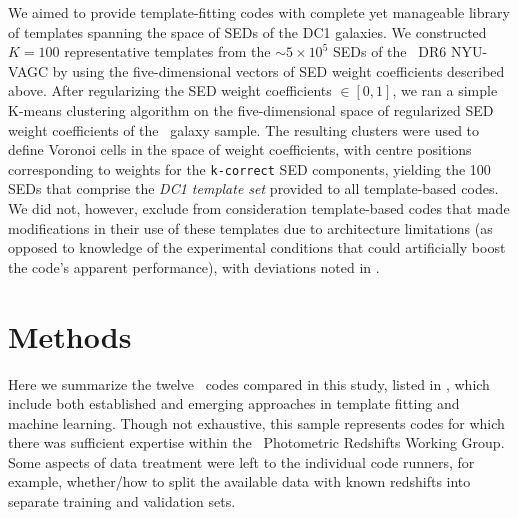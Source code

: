 We aimed to provide template-fitting codes with complete yet manageable library of templates spanning the space of SEDs of the DC1 galaxies.
We constructed $K=100$ representative templates from the $\sim 5 \times 10^{5}$ SEDs of the \sdss\ DR6 NYU-VAGC by using the five-dimensional vectors of SED weight coefficients described above.
After regularizing the SED weight coefficients $\in [0, 1]$, we ran a simple K-means clustering algorithm on the five-dimensional space of regularized SED weight coefficients of the \sdss\ galaxy sample.
The resulting clusters were used to define Voronoi cells in the space of weight coefficients, with centre positions corresponding to weights for the \texttt{k-correct} SED components, yielding the 100 SEDs that comprise the \textit{DC1 template set} provided to all template-based codes.
We did not, however, exclude from consideration template-based codes that made modifications in their use of these templates due to architecture limitations (as opposed to knowledge of the experimental conditions that could artificially boost the code's apparent performance), with deviations noted in .

\section{Methods}

Here we summarize the twelve \pzpdf\ codes compared in this study, listed in , which include both established and emerging approaches in template fitting and machine learning.
Though not exhaustive, this sample represents codes for which there was sufficient expertise within the \desc\ Photometric Redshifts Working Group. %
Some aspects of data treatment were left to the individual code runners, for example, whether/how to split the available data with known redshifts into separate training and validation sets.


